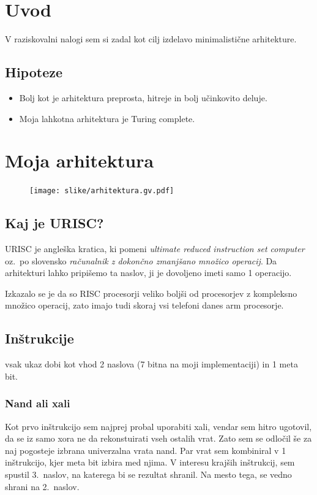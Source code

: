 \documentclass[12pt]{article}
\begin{document}

\section{Uvod}
V raziskovalni nalogi sem si zadal kot cilj izdelavo minimalistične arhitekture.

\subsection{Hipoteze}

\begin{itemize}
  \item Bolj kot je arhitektura preprosta, hitreje in bolj učinkovito deluje.
  \item Moja lahkotna arhitektura je Turing complete.
\end{itemize}

\section{Moja arhitektura}
\begin{figure}[h]
  \centering
  \texttt{[image: slike/arhitektura.gv.pdf]}
  \end{figure}
\subsection{Kaj je URISC?}
URISC je angleška kratica, ki pomeni \textit{ultimate reduced instruction set computer} oz.\ po slovensko \textit{računalnik z dokončno zmanjšano množico operacij}.
Da arhitekturi lahko pripišemo ta naslov, ji je dovoljeno imeti samo 1 operacijo.

Izkazalo se je da so RISC procesorji veliko boljši od procesorjev z kompleksno množico operacij, zato imajo tudi skoraj vsi telefoni danes arm procesorje.
\subsection{Inštrukcije}
vsak ukaz dobi kot vhod 2 naslova (7 bitna na moji implementaciji) in 1 meta bit.
\subsubsection{Nand ali xali}
Kot prvo inštrukcijo sem najprej probal uporabiti xali, vendar sem hitro ugotovil, da se iz samo xora ne da rekonstuirati vseh ostalih vrat.
Zato sem se odločil še za naj pogosteje izbrana univerzalna vrata nand.
Par vrat sem kombiniral v 1 inštrukcijo, kjer meta bit izbira med njima.
V interesu krajših inštrukcij, sem spustil 3.\ naslov, na katerega bi se rezultat shranil. Na mesto tega, se vedno shrani na 2.\ naslov.
\end{document}
